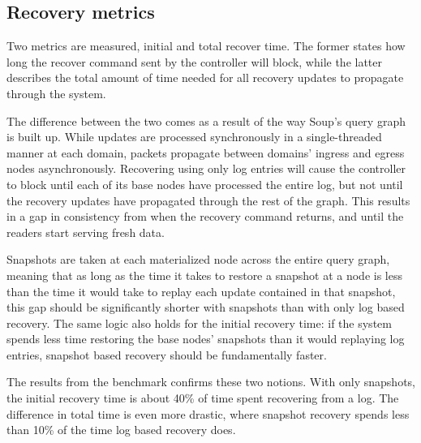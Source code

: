 \documentclass[b5paper]{report}
\begin{document}
\subsection{Recovery metrics}
Two metrics are measured, initial and total recover time. The former states how
long the recover command sent by the controller will block, while the latter
describes the total amount of time needed for all recovery updates to propagate
through the system.

The difference between the two comes as a result of the way Soup's query graph
is built up. While updates are processed synchronously in a single-threaded
manner at each domain, packets propagate between domains' ingress and egress
nodes asynchronously. Recovering using only log entries will cause the
controller to block until each of its base nodes have processed the entire log,
but not until the recovery updates have propagated through the rest of the graph.
This results in a gap in consistency from when the recovery command returns, and
until the readers start serving fresh data.

Snapshots are taken at each materialized node across the entire query
graph, meaning that as long as the time it takes to restore a snapshot at a node
is less than the time it would take to replay each update contained in that
snapshot, this gap should be significantly shorter with snapshots than with only
log based recovery. The same logic also holds for the initial recovery time: if
the system spends less time restoring the base nodes' snapshots than it would
replaying log entries, snapshot based recovery should be fundamentally faster.

The results from the benchmark confirms these two notions. With only snapshots,
the initial recovery time is about 40\% of time spent recovering from a log.
The difference in total time is even more drastic, where snapshot recovery
spends less than 10\% of the time log based recovery does.
\end{document}
